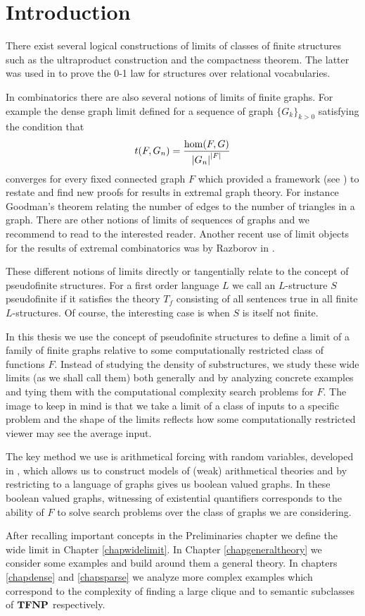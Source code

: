\chapter*{Introduction}

There exist several logical constructions of limits of classes of finite structures such as the ultraproduct construction and the compactness theorem. The latter was used in \cite{Fagin1976} to prove the 0-1 law for structures over relational vocabularies.

In combinatorics there are also several notions of limits of finite graphs. For example the dense graph limit defined for a sequence of graph $\{G_k\}_{k>0}$ satisfying the condition that
\[t(F,G_n)=\frac{\hom(F,G)}{\left|{G_n}\right|^{\left|{F}\right|}}\]
converges for every fixed connected graph $F$ which provided a framework (see \cite{lovasz2006limits}) to restate and find new proofs for results in extremal graph theory. For instance Goodman's theorem relating the number of edges to the number of triangles in a graph. There are other notions of limits of sequences of graphs and we recommend to read \cite{Nesetril2013} to the interested reader. Another recent use of limit objects for the results of extremal combinatorics was by Razborov in \cite{razborov2007flag}.

These different notions of limits directly or tangentially relate to the concept of pseudofinite structures. For a first order language $L$ we call an $L$-structure $S$ pseudofinite if it satisfies the theory $T_f$ consisting of all sentences true in all finite $L$-structures. Of course, the interesting case is when $S$ is itself not finite.

In this thesis we use the concept of pseudofinite structures to define a limit of a family of finite graphs relative to some computationally restricted class of functions $F$. Instead of studying the density of substructures, we study these wide limits (as we shall call them) both generally and by analyzing concrete examples and tying them with the computational complexity search problems for $F$. The image to keep in mind is that we take a limit of a class of inputs to a specific problem and the shape of the limits reflects how some computationally restricted viewer may see the average input.

The key method we use is arithmetical forcing with random variables, developed in \cite{krajicek2010forcing}, which allows us to construct models of (weak) arithmetical theories and by restricting to a language of graphs gives us boolean valued graphs. In these boolean valued graphs, witnessing of existential quantifiers corresponds to the ability of $F$ to solve search problems over the class of graphs we are considering.

After recalling important concepts in the Preliminaries chapter we define the wide limit in Chapter \ref{chapwidelimit}. In Chapter \ref{chapgeneraltheory} we consider some examples and build around them a general theory. In chapters \ref{chapdense} and \ref{chapsparse} we analyze more complex examples which correspond to the complexity of finding a large clique and to semantic subclasses of $\textbf{TFNP}$ respectively. 
